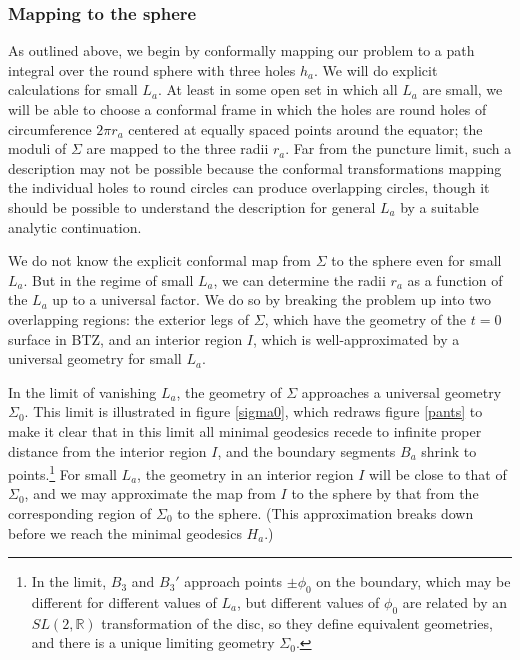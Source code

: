 \documentclass[12pt]{article}
\numberwithin{equation}{section}
\begin{document}
\subsubsection{Mapping to the sphere}

As outlined above, we begin by conformally mapping our problem to a path integral over the round sphere with three holes $h_a$. We will do explicit calculations for small $L_a$. At least in some open set in which all $L_a$ are small, we will be able to choose a conformal frame in which the holes are round holes of circumference $2 \pi r_a$ centered at equally spaced points around the equator; the moduli of $\Sigma$ are mapped to the three radii $r_a$. Far from the puncture limit, such a description may not be possible because the conformal transformations mapping the individual holes to round circles can produce overlapping circles, though it should be possible to understand the description for general $L_a$ by a suitable analytic continuation.

We do not know  the explicit conformal map from $\Sigma$ to the sphere even for small $L_a$. But in the regime of small $L_a$, we can determine the radii $r_a$ as a function of the $L_a$ up to a universal factor. We do so by breaking the problem up into two overlapping regions: the exterior legs of $\Sigma$, which have the geometry of the $t=0$ surface in BTZ, and an interior region $I$, which is well-approximated by a universal geometry for small $L_a$.

In the limit of vanishing $L_a$, the geometry of $\Sigma$ approaches a universal geometry $\Sigma_0$. This limit is illustrated in figure \ref{sigma0}, which redraws figure \ref{pants} to make it clear that in this limit all minimal geodesics recede to infinite proper distance from the interior region $I$, and the boundary segments $B_a$ shrink to points.\footnote{In the limit, $B_3$ and $B_3'$ approach points $\pm \phi_0$ on the boundary, which may be different for different values of $L_a$, but different values of $\phi_0$ are related by an $SL(2,\mathbb{R})$ transformation of the disc, so they define equivalent geometries, and there is a unique limiting geometry $\Sigma_0$.} For small $L_a$, the geometry in an interior region $I$ will be close to that of $\Sigma_0$, and we may  approximate the map from $I$ to the sphere by that from the corresponding region of $\Sigma_0$ to the sphere.  (This approximation breaks down before we reach the minimal geodesics $H_a$.)
\end{document}
